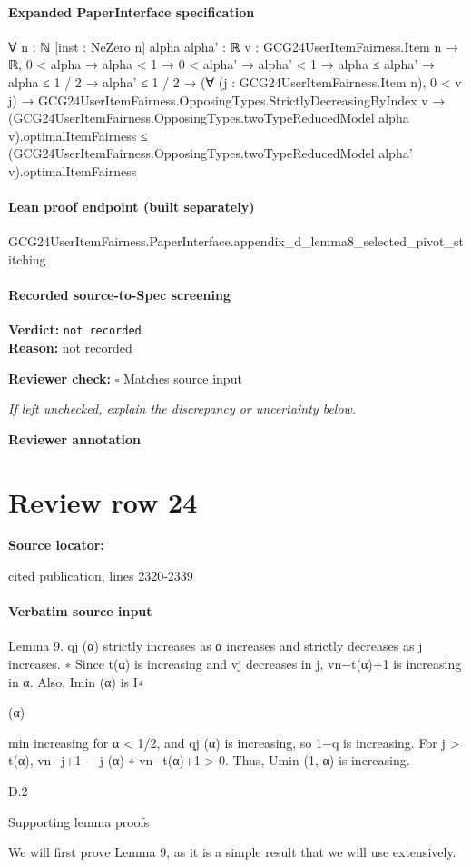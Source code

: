 \documentclass[10pt]{article}
\newcommand{\reviewerbox}{%
  \par\noindent\fbox{\parbox{0.96\linewidth}{\rule{0pt}{0.38in}}}\par
}
\newcommand{\reviewmatch}[1]{%
  \par\noindent\textbf{Reviewer check:} $\square$\; #1\par
  \noindent\emph{If left unchecked, explain the discrepancy or uncertainty below.}\par
}
\begin{document}
\paragraph{Expanded PaperInterface specification}
\begin{ReviewVerbatim}
∀ {n : ℕ} [inst : NeZero n] {alpha alpha' : ℝ} {v : GCG24UserItemFairness.Item n → ℝ},
  0 < alpha →
    alpha < 1 →
      0 < alpha' →
        alpha' < 1 →
          alpha ≤ alpha' →
            alpha ≤ 1 / 2 →
              alpha' ≤ 1 / 2 →
                (∀ (j : GCG24UserItemFairness.Item n), 0 < v j) →
                  GCG24UserItemFairness.OpposingTypes.StrictlyDecreasingByIndex v →
                    (GCG24UserItemFairness.OpposingTypes.twoTypeReducedModel alpha v).optimalItemFairness ≤
                      (GCG24UserItemFairness.OpposingTypes.twoTypeReducedModel alpha' v).optimalItemFairness
\end{ReviewVerbatim}

\paragraph{Lean proof endpoint (built separately)}\begin{ReviewVerbatim}
GCG24UserItemFairness.PaperInterface.appendix_d_lemma8_selected_pivot_stitching
\end{ReviewVerbatim}

\paragraph{Recorded source-to-Spec screening}
\textbf{Verdict:} \texttt{not recorded}
\\
\textbf{Reason:} not recorded
\reviewmatch{Matches source input}
\noindent\textbf{Reviewer annotation}\par
\reviewerbox
\clearpage
\hypertarget{source-claim-b15ee860ec553bb1}{}
\section*{Review row 24}
\textbf{Source locator:} {\footnotesize\raggedright cited publication, lines 2320-\allowbreak{}2339\par}
\paragraph{Verbatim source input}
\begin{ReviewVerbatim}
Lemma 9. qj (α) strictly increases as α increases and strictly decreases as j increases.
∗
Since t(α) is increasing and vj decreases in j, vn−t(α)+1 is increasing in α. Also, Imin
(α) is
I∗

(α)

min
increasing for α < 1/2, and qj (α) is increasing, so 1−q
is increasing. For j > t(α), vn−j+1 −
j (α)
∗
vn−t(α)+1 > 0. Thus, Umin (1, α) is increasing.

D.2

Supporting lemma proofs

We will first prove Lemma 9, as it is a simple result that we will use extensively.
\end{ReviewVerbatim}
\end{document}
